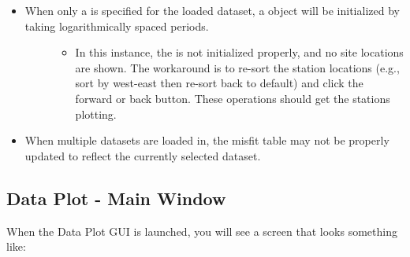 \documentclass[letterpaper,10pt,english]{sphinxmanual}
\begin{document}
\begin{itemize}
\item {} \begin{description}
\item[{When only a {\hyperref[\detokenize{content/api_core/input_files:list-file}]{}} is specified for the loaded dataset, a {\hyperref[\detokenize{content/api_core/data_structures:data}]{}} object will be initialized by taking logarithmically spaced periods.}] \leavevmode\begin{itemize}
\item {} 
In this instance, the {\hyperref[\detokenize{content/data_plot/map_viewer:map-viewer}]{}} is not initialized properly, and no site locations are shown. The workaround is to re-sort the station locations (e.g., sort by west-east then re-sort back to default) and click the forward or back button. These operations should get the stations plotting.

\end{itemize}

\end{description}

\item {} 
When multiple datasets are loaded in, the misfit table may not be properly updated to reflect the currently selected dataset.

\end{itemize}


\subsection{Data Plot - Main Window}
\label{\detokenize{content/data_plot/main_window:data-plot-main-window}}\label{\detokenize{content/data_plot/main_window:data-plot}}\label{\detokenize{content/data_plot/main_window::doc}}
When the Data Plot GUI is launched, you will see a screen that looks something like:

\begin{figure}[htbp]
\centering

\noindent{}
\end{figure}
\end{document}
